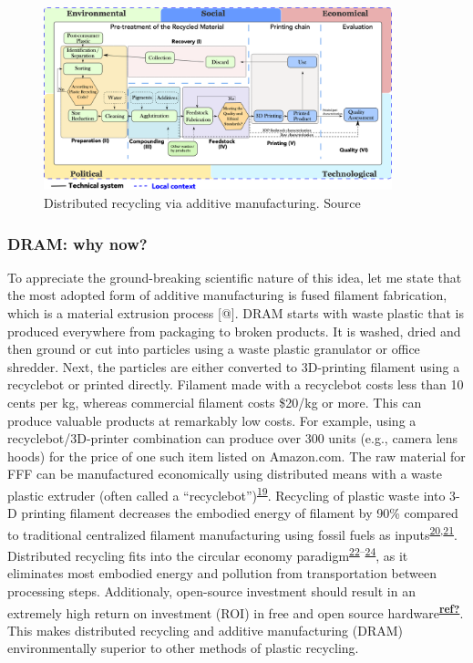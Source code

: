 \documentclass[
  11pt,
  a4paperpaper,
  onecolumn]{article}
\begin{document}
\begin{figure}

{\centering \includegraphics[width=0.9\textwidth,height=\textheight]{Figures/SDRAM-00.png}

}

\caption{\label{fig-DRAM}Distributed recycling via additive
manufacturing. Source}

\end{figure}

\hypertarget{dram-why-now}{%
\subsubsection{DRAM: why now?}\label{dram-why-now}}

To appreciate the ground-breaking scientific nature of this idea, let me
state that the most adopted form of additive manufacturing is fused
filament fabrication, which is a material extrusion process {[}@{]}.
DRAM starts with waste plastic that is produced everywhere from
packaging to broken products. It is washed, dried and then ground or cut
into particles using a waste plastic granulator or office shredder.
Next, the particles are either converted to 3D-printing filament using a
recyclebot or printed directly. Filament made with a recyclebot costs
less than 10 cents per kg, whereas commercial filament costs \$20/kg or
more. This can produce valuable products at remarkably low costs. For
example, using a recyclebot/3D-printer combination can produce over 300
units (e.g., camera lens hoods) for the price of one such item listed on
Amazon.com. The raw material for FFF can be manufactured economically
using distributed means with a waste plastic extruder (often called a
``recyclebot'')\textsuperscript{\protect\hyperlink{ref-Baechler2013}{19}}.
Recycling of plastic waste into 3-D printing filament decreases the
embodied energy of filament by 90\% compared to traditional centralized
filament manufacturing using fossil fuels as
inputs\textsuperscript{\protect\hyperlink{ref-Kreiger2013}{20},\protect\hyperlink{ref-Zhong2017}{21}}.
Distributed recycling fits into the circular economy
paradigm\textsuperscript{\protect\hyperlink{ref-Zhong2018}{22}--\protect\hyperlink{ref-Despeisse2016}{24}},
as it eliminates most embodied energy and pollution from transportation
between processing steps. Additionaly, open-source investment should
result in an extremely high return on investment (ROI) in free and open
source
hardware\textsuperscript{\protect\hyperlink{ref-ref}{\textbf{ref?}}}.
This makes distributed recycling and additive manufacturing (DRAM)
environmentally superior to other methods of plastic recycling.
\end{document}
